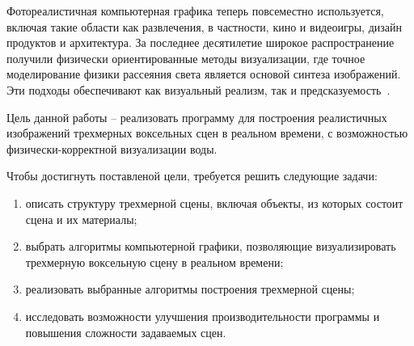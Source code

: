 Фотореалистичная компьютерная графика теперь повсеместно 
используется, включая такие области как развлечения, в частности, 
кино и видеоигры, дизайн продуктов и архитектура. За последнее 
десятилетие широкое распространение получили физически ориентированные 
методы визуализации, где точное моделирование физики рассеяния света 
является основой синтеза изображений. Эти подходы обеспечивают как 
визуальный реализм, так и предсказуемость~\cite{PBRT3e}.

Цель данной работы -- реализовать программу для построения 
реалистичных изображений трехмерных воксельных сцен в реальном времени,
с возможностью физически-корректной визуализации воды.

Чтобы достигнуть поставленой цели, требуется решить следующие задачи:
\begin{enumerate}[label*=---]
    \item описать структуру трехмерной сцены, включая объекты, из которых
          состоит сцена и их материалы;
    \item выбрать алгоритмы компьютерной 
          графики, позволяющие визуализировать трехмерную воксельную
          сцену в реальном времени;
    \item реализовать выбранные алгоритмы построения трехмерной сцены;
    \item исследовать возможности улучшения производительности программы
          и повышения сложности задаваемых сцен.
\end{enumerate}
